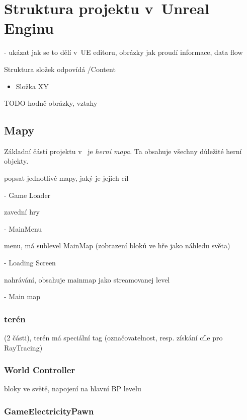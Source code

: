 
\section{Struktura projektu v~Unreal Enginu}
\label{sec:ueStructure}

- ukázat jak se to dělí v~UE editoru, obrázky jak proudí informace, data flow

Struktura složek odpovídá /Content

\begin{itemize}
	\item Složka XY
\end{itemize}


TODO hodně obrázky, vztahy

\subsection{Mapy}

Základní částí projektu v~ je \textit{herní mapa}. Ta obsahuje všechny důležité herní objekty.

popsat jednotlivé mapy, jaký je jejich cíl

- Game Loader

zavední hry

- MainMenu

menu, má sublevel MainMap (zobrazení bloků ve hře jako náhledu světa)

- Loading Screen

nahrávání, obsahuje mainmap jako streamovanej level

- Main map

\subsubsection{terén}

 (2 části), terén má speciální tag (označovatelnost, resp. získání cíle pro RayTracing)

\subsubsection{World Controller}

bloky ve světě, napojení na hlavní BP levelu

\subsubsection{GameElectricityPawn}

